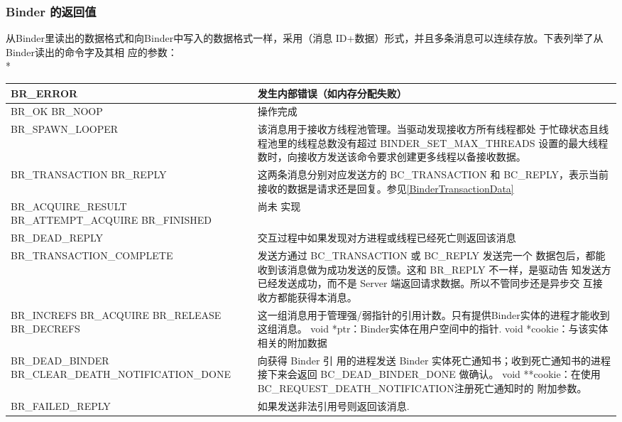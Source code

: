 \documentclass[a4paper,11pt]{article}
\begin{document}
\subsubsection{Binder 的返回值}
从Binder里读出的数据格式和向Binder中写入的数据格式一样，采用（消息
ID+数据）形式，并且多条消息可以连续存放。下表列举了从Binder读出的命令字及其相
应的参数：\\*
\label{proto:binderreturn}
\begin{longtable}{|p{}|p{}|}\hline
    BR_ERROR & 发生内部错误（如内存分配失败） \\\hline
    BR_OK \newline BR_NOOP & 操作完成 \\\hline
    BR_SPAWN_LOOPER & 该消息用于接收方线程池管理。当驱动发现接收方所有线程都处
    于忙碌状态且线程池里的线程总数没有超过 BINDER_SET_MAX_THREADS
    设置的最大线程数时，向接收方发送该命令要求创建更多线程以备接收数据。
    \\\hline
    BR_TRANSACTION \newline BR_REPLY & 这两条消息分别对应发送方的
    BC_TRANSACTION 和 BC_REPLY，表示当前接收的数据是请求还是回复。参见\ref{BinderTransactionData}\\\hline
    BR_ACQUIRE_RESULT \newline BR_ATTEMPT_ACQUIRE \newline BR_FINISHED & 尚未
    实现 \\\hline
    BR_DEAD_REPLY & 交互过程中如果发现对方进程或线程已经死亡则返回该消息
    \\\hline
    BR_TRANSACTION_COMPLETE & 发送方通过 BC_TRANSACTION 或 BC_REPLY 发送完一个
    数据包后，都能收到该消息做为成功发送的反馈。这和 BR_REPLY 不一样，是驱动告
    知发送方已经发送成功，而不是 Server 端返回请求数据。所以不管同步还是异步交
    互接收方都能获得本消息。\\\hline
    BR_INCREFS \newline  BR_ACQUIRE \newline BR_RELEASE \newline BR_DECREFS \newline
    & 这一组消息用于管理强/弱指针的引用计数。只有提供Binder实体的进程才能收到这组消息。
   void *ptr：Binder实体在用户空间中的指针.  void *cookie：与该实体相关的附加数据 \\\hline
   BR_DEAD_BINDER \newline BR_CLEAR_DEATH_NOTIFICATION_DONE & 向获得 Binder 引
   用的进程发送 Binder 实体死亡通知书；收到死亡通知书的进程接下来会返回
   BC_DEAD_BINDER_DONE 做确认。
   \newline void **cookie：在使用BC_REQUEST_DEATH_NOTIFICATION注册死亡通知时的
   附加参数。\\\hline
   BR_FAILED_REPLY & 如果发送非法引用号则返回该消息. \\\hline
\end{longtable}
\end{document}
